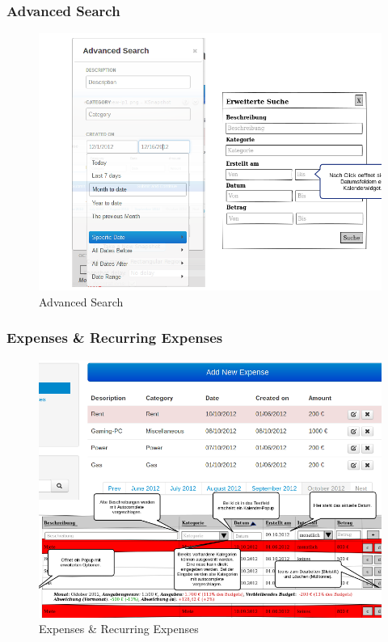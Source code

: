 \documentclass[a4paper,10pt]{article}
\begin{document}

\clearpage
\subsubsection{Advanced Search}

\begin{figure}
\centering
\includegraphics[width=\textwidth]{advanced-search}
\caption{Advanced Search} \label{fig:advanced-search}
\end{figure}


\clearpage
\subsubsection{Expenses \& Recurring Expenses}

\begin{figure}
\centering
\includegraphics[width=\textwidth]{expenses}
\caption{Expenses \& Recurring Expenses} \label{fig:expenses}
\end{figure}
\end{document}
